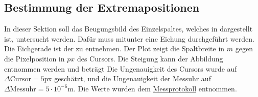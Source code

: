 \subsection{Bestimmung der Extremapositionen}
In dieser Sektion soll das Beugungsbild des Einzelspaltes, welches in  dargestellt ist, untersucht werden. Dafür muss mitunter eine Eichung durchgeführt werden. 
Die Eichgerade ist der  zu entnehmen. Der Plot zeigt die Spaltbreite in $m$ gegen die Pixelposition in $px$ des Cursors.
Die Steigung kann der Abbildung entnommen werden und beträgt
Die Ungenauigkeit des Cursors wurde auf $\Delta \text{Cursor} = 5$px geschätzt, und die Ungenauigkeit der Messuhr auf $\Delta \text{Messuhr} = 5\cdot10^{-6} \mathrm{m}$. Die Werte wurden dem \hyperref[ch:Protokoll]{Messprotokoll} entnommen. 


